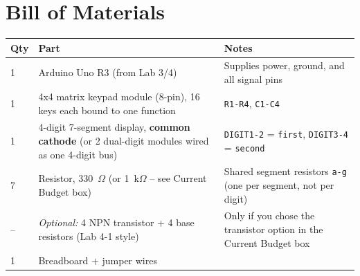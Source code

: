 \documentclass[11pt]{article}
\begin{document}
\section*{Bill of Materials}
\begin{center}
\begin{tabular}{@{}p{1.4cm}p{6.3cm}p{7.5cm}@{}}
\toprule
\textbf{Qty} & \textbf{Part} & \textbf{Notes} \\
\midrule
1 & Arduino Uno R3 (from Lab 3/4) & Supplies power, ground, and all signal pins \\
1 & 4x4 matrix keypad module (8-pin), 16 keys each bound to one function &
\texttt{R1-R4}, \texttt{C1-C4} \\
1 & 4-digit 7-segment display, \textbf{common cathode} (or 2 dual-digit modules
wired as one 4-digit bus) & \texttt{DIGIT1-2} = \texttt{first}, \texttt{DIGIT3-4}
= \texttt{second} \\
7 & Resistor, 330~$\Omega$ (or 1~k$\Omega$ -- see Current Budget box) & Shared
segment resistors \texttt{a-g} (one per segment, not per digit) \\
-- & \emph{Optional:} 4 NPN transistor + 4 base resistors (Lab 4-1 style) &
Only if you chose the transistor option in the Current Budget box \\
1 & Breadboard + jumper wires & \\
\bottomrule
\end{tabular}
\end{center}
\end{document}
